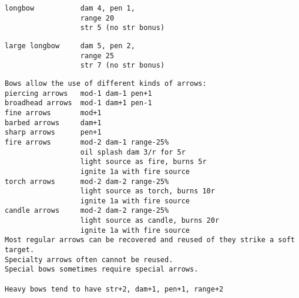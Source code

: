 \begin{samepage}
\begin{verbatim}
longbow           dam 4, pen 1,
                  range 20
                  str 5 (no str bonus)
\end{verbatim} \blocklistgap \begin{verbatim}
large longbow     dam 5, pen 2,
                  range 25
                  str 7 (no str bonus)
\end{verbatim} \blocklistgap \begin{verbatim}
Bows allow the use of different kinds of arrows:
piercing arrows   mod-1 dam-1 pen+1
broadhead arrows  mod-1 dam+1 pen-1
fine arrows       mod+1
barbed arrows     dam+1
sharp arrows      pen+1
fire arrows       mod-2 dam-1 range-25%
                  oil splash dam 3/r for 5r
                  light source as fire, burns 5r
                  ignite 1a with fire source
torch arrows      mod-2 dam-2 range-25%
                  light source as torch, burns 10r
                  ignite 1a with fire source
candle arrows     mod-2 dam-2 range-25%
                  light source as candle, burns 20r
                  ignite 1a with fire source
Most regular arrows can be recovered and reused of they strike a soft target.
Specialty arrows often cannot be reused.
Special bows sometimes require special arrows.

Heavy bows tend to have str+2, dam+1, pen+1, range+2
\end{verbatim} \end{samepage} \normalsize \goodbreak

\

